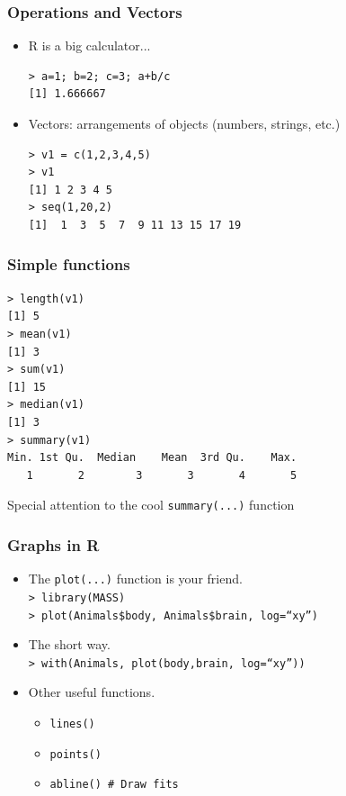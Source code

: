 \documentclass{beamer}
\begin{document}

\begin{frame}[fragile]

\frametitle{Operations and Vectors}
\begin{itemize}
 \item R is a big calculator...\\
 \begin{verbatim}
> a=1; b=2; c=3; a+b/c
[1] 1.666667
  \end{verbatim} 
  \vspace{-0.5cm}
  \item Vectors: arrangements of objects (numbers, strings, etc.)\\
  \begin{verbatim}
> v1 = c(1,2,3,4,5)
> v1
[1] 1 2 3 4 5
> seq(1,20,2)
[1]  1  3  5  7  9 11 13 15 17 19
  \end{verbatim}
  \end{itemize}

\end{frame}


\begin{frame}[fragile]

 \frametitle{Simple functions}
 \begin{verbatim}
> length(v1)
[1] 5
> mean(v1)
[1] 3
> sum(v1)
[1] 15
> median(v1)
[1] 3
> summary(v1)
Min. 1st Qu.  Median    Mean  3rd Qu.    Max. 
   1       2        3       3       4       5
 \end{verbatim}
 \vspace{-0.9cm}
 Special attention to the cool \texttt{summary(...)} function

\end{frame}


\begin{frame}[fragile]

 \frametitle{Graphs in R}
 \begin{itemize}
  \item The \texttt{plot(...)} function is your friend.\\
  \texttt{> library(MASS)}\\
  \texttt{> plot(Animals\$body, Animals\$brain, log=``xy'')}
  \item The short way.\\
  \texttt{> with(Animals, plot(body,brain, log=``xy''))}
  \item Other useful functions.
  \begin{itemize}
   \item \texttt{lines()}
   \item \texttt{points()}
   \item \texttt{abline() \# Draw fits}
  
  \end{itemize}
  \end{itemize}

\end{frame}
\end{document}
